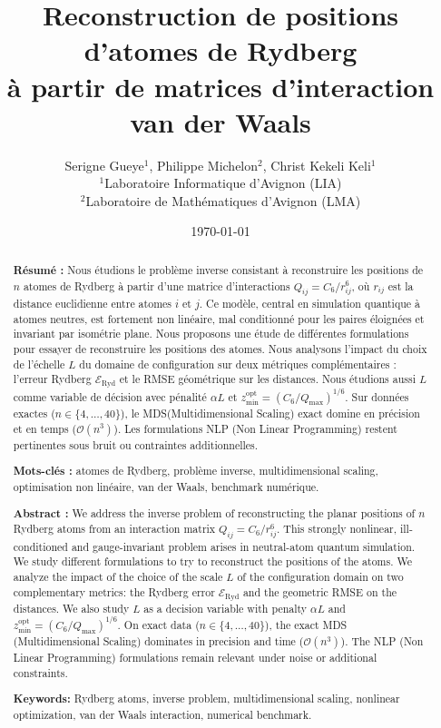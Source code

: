 \documentclass[11pt,a4paper]{article}
\title{%
  Reconstruction de positions d'atomes de Rydberg\\
  \large à partir de matrices d'interaction van der Waals
}
\author{
Serigne Gueye$^{1}$,
Philippe Michelon$^{2}$,
Christ Kekeli Keli$^{1}$\\
\small $^{1}$Laboratoire Informatique d'Avignon (LIA)\\
\small $^{2}$Laboratoire de Mathématiques d'Avignon (LMA)
}
\date{\today}
\theoremstyle{definition}
\theoremstyle{remark}
\newcommand{\Eryd}{\mathcal{E}_{\mathrm{Ryd}}}
\newcommand{\cSix}{C_6}
\begin{document}
\maketitle

\begin{abstract}
\noindent
\textbf{Résumé :}
Nous étudions le problème inverse consistant à reconstruire les positions
de $n$ atomes de Rydberg à partir d'une matrice d'interactions
$Q_{ij} = \cSix/r_{ij}^6$, où $r_{ij}$ est la distance euclidienne entre
atomes $i$ et $j$. Ce modèle, central en simulation quantique à atomes neutres,
est fortement non linéaire, mal conditionné pour les paires éloignées et
invariant par isométrie plane. Nous proposons une étude de
différentes formulations pour essayer de reconstruire les positions des atomes. 
Nous analysons l'impact du choix de l'échelle $L$ du domaine de configuration sur
deux métriques complémentaires : l'erreur Rydberg $\Eryd$ et le RMSE
géométrique sur les distances. Nous étudions aussi $L$ comme variable
de décision avec pénalité $\alpha L$ et
$z_{\min}^{\mathrm{opt}}=(\cSix/Q_{\max})^{1/6}$. Sur données exactes ($n \in \{4,\ldots,40\}$),
le MDS(Multidimensional Scaling) exact domine en précision et en temps ($\mathcal{O}(n^3)$). Les
formulations NLP (Non Linear Programming) restent pertinentes sous bruit ou contraintes additionnelles.

\medskip
\noindent
\textbf{Mots-clés :}
atomes de Rydberg, problème inverse, multidimensional scaling,
optimisation non linéaire, van der Waals, benchmark numérique.
\end{abstract}

\begin{abstract}
\noindent
\textbf{Abstract :}
We address the inverse problem of reconstructing the planar positions of
$n$ Rydberg atoms from an interaction matrix $Q_{ij} = C_6/r_{ij}^6$. This
strongly nonlinear, ill-conditioned and gauge-invariant problem arises in
neutral-atom quantum simulation. We study different formulations to try to reconstruct the positions of the atoms.
We analyze the impact of the choice of the scale $L$ of the configuration domain on
two complementary metrics: the Rydberg error $\Eryd$ and the geometric RMSE on the distances.
We also study $L$ as a decision variable with penalty $\alpha L$ and
$z_{\min}^{\mathrm{opt}}=(C_6/Q_{\max})^{1/6}$.
On exact data ($n \in \{4,\ldots,40\}$), the exact MDS (Multidimensional Scaling) dominates in precision and time ($\mathcal{O}(n^3)$).
The NLP (Non Linear Programming) formulations remain relevant under noise or additional constraints.

\medskip
\noindent
\textbf{Keywords:}
Rydberg atoms, inverse problem, multidimensional scaling,
nonlinear optimization, van der Waals interaction, numerical benchmark.                                         
\end{abstract}
\end{document}
